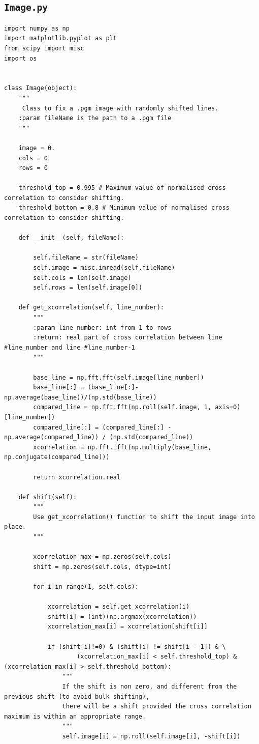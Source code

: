 \documentclass[a4paper,12pt]{article}
\begin{document}
\subsection{\texttt{Image.py}}

\begin{lstlisting}[language=numpy]
import numpy as np
import matplotlib.pyplot as plt
from scipy import misc
import os


class Image(object):
    """
     Class to fix a .pgm image with randomly shifted lines.
    :param fileName is the path to a .pgm file
    """

    image = 0.
    cols = 0
    rows = 0

    threshold_top = 0.995 # Maximum value of normalised cross correlation to consider shifting.
    threshold_bottom = 0.8 # Minimum value of normalised cross correlation to consider shifting.

    def __init__(self, fileName):

        self.fileName = str(fileName)
        self.image = misc.imread(self.fileName)
        self.cols = len(self.image)
        self.rows = len(self.image[0])

    def get_xcorrelation(self, line_number):
        """
        :param line_number: int from 1 to rows
        :return: real part of cross correlation between line #line_number and line #line_number-1
        """

        base_line = np.fft.fft(self.image[line_number])
        base_line[:] = (base_line[:]-np.average(base_line))/(np.std(base_line))
        compared_line = np.fft.fft(np.roll(self.image, 1, axis=0)[line_number])
        compared_line[:] = (compared_line[:] - np.average(compared_line)) / (np.std(compared_line))
        xcorrelation = np.fft.ifft(np.multiply(base_line, np.conjugate(compared_line)))

        return xcorrelation.real

    def shift(self):
        """
        Use get_xcorrelation() function to shift the input image into place.
        """

        xcorrelation_max = np.zeros(self.cols)
        shift = np.zeros(self.cols, dtype=int)

        for i in range(1, self.cols):

            xcorrelation = self.get_xcorrelation(i)
            shift[i] = (int)(np.argmax(xcorrelation))
            xcorrelation_max[i] = xcorrelation[shift[i]]

            if (shift[i]!=0) & (shift[i] != shift[i - 1]) & \
                    (xcorrelation_max[i] < self.threshold_top) & (xcorrelation_max[i] > self.threshold_bottom):
                """
                If the shift is non zero, and different from the previous shift (to avoid bulk shifting),
                there will be a shift provided the cross correlation maximum is within an appropriate range.
                """
                self.image[i] = np.roll(self.image[i], -shift[i])


\end{lstlisting}
\end{document}
